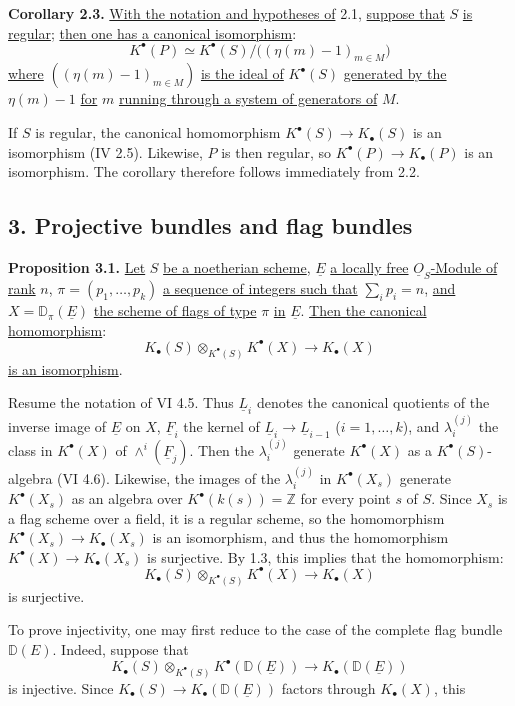 \textbf{Corollary 2.3.} \uline{With the notation and hypotheses of} 2.1, \uline{suppose that} $S$ \uline{is regular}; \uline{then one has a canonical isomorphism}:
\[
K^{\bullet}(P)\simeq K^{\bullet}(S)/\bigl((\eta(m)-1)_{m\in M}\bigr)
\]
\uline{where} $((\eta(m)-1)_{m\in M})$ \uline{is the ideal of} $K^{\bullet}(S)$ \uline{generated by the} $\eta(m)-1$ \uline{for} $m$ \uline{running through a system of generators of} $M$.

If $S$ is regular, the canonical homomorphism $K^{\bullet}(S)\to K_\bullet(S)$ is an isomorphism (IV 2.5). Likewise, $P$ is then regular, so $K^{\bullet}(P)\to K_\bullet(P)$ is an isomorphism. The corollary therefore follows immediately from 2.2.


%

\subsection*{3. Projective bundles and flag bundles}

\textbf{Proposition 3.1.} \uline{Let} $S$ \uline{be a noetherian scheme}, $\underline{E}$ \uline{a locally free} $\underline{O}_S$\uline{-Module of rank} $n$, $\pi=(p_1,\ldots,p_k)$ \uline{a sequence of integers such that} $\sum_i p_i=n$, \uline{and} $X=\mathbb D_\pi(\underline{E})$ \uline{the scheme of flags of type} $\pi$ \uline{in} $\underline{E}$. \uline{Then the canonical homomorphism}:
\[
K_\bullet(S)\otimes_{K^{\bullet}(S)}K^{\bullet}(X)\longrightarrow K_\bullet(X)
\]
\uline{is an isomorphism}.

Resume the notation of VI 4.5. Thus $\underline{L}_i$ denotes the canonical quotients of the inverse image of $\underline{E}$ on $X$, $\underline{F}_i$ the kernel of $\underline{L}_i\to \underline{L}_{i-1}$ ($i=1,\ldots,k$), and $\lambda_i^{(j)}$ the class in $K^{\bullet}(X)$ of $\wedge^i(\underline{F}_j)$. Then the $\lambda_i^{(j)}$ generate $K^{\bullet}(X)$ as a $K^{\bullet}(S)$-algebra (VI 4.6). Likewise, the images of the $\lambda_i^{(j)}$ in $K^{\bullet}(X_s)$ generate $K^{\bullet}(X_s)$ as an algebra over $K^{\bullet}(k(s))=\mathbb Z$ for every point $s$ of $S$. Since $X_s$ is a flag scheme over a field, it is a regular scheme, so the homomorphism $K^{\bullet}(X_s)\to K_\bullet(X_s)$ is an isomorphism, and thus the homomorphism $K^{\bullet}(X)\to K_\bullet(X_s)$ is surjective. By 1.3, this implies that the homomorphism:
\[
K_\bullet(S)\otimes_{K^{\bullet}(S)}K^{\bullet}(X)\longrightarrow K_\bullet(X)
\]
is surjective.

To prove injectivity, one may first reduce to the case of the complete flag bundle $\mathbb D(E)$. Indeed, suppose that
\[
K_\bullet(S)\otimes_{K^{\bullet}(S)}K^{\bullet}(\mathbb D(\underline{E}))\longrightarrow K_\bullet(\mathbb D(\underline{E}))
\]
is injective. Since $K_\bullet(S)\to K_\bullet(\mathbb D(\underline{E}))$ factors through $K_\bullet(X)$, this

